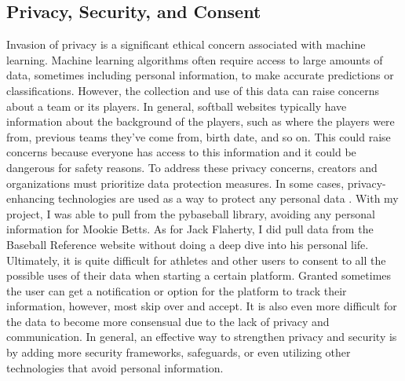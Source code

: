 \documentclass[10pt,twocolumn]{article}
\begin{document}
\subsection{Privacy, Security, and Consent}
Invasion of privacy is a significant ethical concern associated with machine learning. Machine learning algorithms often require access to large amounts of data, sometimes including personal information, to make accurate predictions or classifications. However, the collection and use of this data can raise concerns about a team or its players. In general, softball websites typically have information about the background of the players, such as where the players were from, previous teams they’ve come from, birth date, and so on. This could raise concerns because everyone has access to this information and it could be dangerous for safety reasons. To address these privacy concerns, creators and organizations must prioritize data protection measures. In some cases, privacy-enhancing technologies are used as a way to protect any personal data \cite{21}. With my project, I was able to pull from the pybaseball library, avoiding any personal information for Mookie Betts. As for Jack Flaherty, I did pull data from the Baseball Reference website without doing a deep dive into his personal life.  Ultimately, it is quite difficult for athletes and other users to consent to all the possible uses of their data when starting a certain platform. Granted sometimes the user can get a notification or option for the platform to track their information, however, most skip over and accept. It is also even more difficult for the data to become more consensual due to the lack of privacy and communication. In general, an effective way to strengthen privacy and security is by adding more security frameworks, safeguards, or even utilizing other technologies that avoid personal information. 
\end{document}
